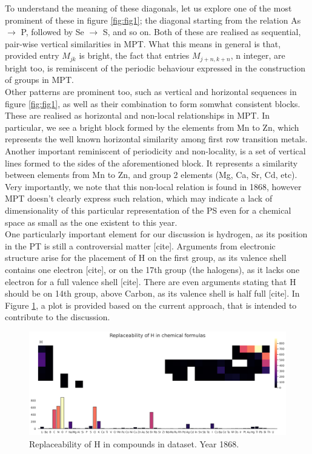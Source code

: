 \documentclass[article]{article}
\begin{document}
To understand the meaning of these diagonals, let us explore one of the most prominent of these in figure \ref{fig:fig1}; the diagonal starting from the relation As $\rightarrow$ P, followed by Se $\rightarrow$ S, and so on. Both of these are realised as sequential, pair-wise vertical similarities in MPT. What this means in general is that, provided entry $M_{jk}$ is bright, the fact that entries $M_{j+n,k+n}$, n integer, are bright too, is reminiscent of the periodic behaviour expressed in the construction of groups in MPT. \\

Other patterns are prominent too, such as vertical and horizontal sequences in figure \ref{fig:fig1}, as well as their combination to form somwhat consistent blocks. These are realised as horizontal and non-local relationships in MPT. In particular, we see a bright block formed by the elements from Mn to Zn, which represents the well known horizontal similarity among first row transition metals. Another important reminiscent of periodicity and non-locality, is a set of vertical lines formed to the sides of the aforementioned block. It represents a similarity between elements from Mn to Zn, and group 2 elements (Mg, Ca, Sr, Cd, etc). Very importantly, we note that this non-local relation is found in 1868, however MPT doesn't clearly express such relation, which may indicate a lack of dimensionality of this particular representation of the PS even for a chemical space as small as the one existent to this year.\\

One particularly important element for our discussion is hydrogen, as its position in the PT is still a controversial matter [cite]. Arguments from electronic structure arise for the placement of H on the first group, as its valence shell contains one electron [cite], or on the 17th group (the halogens), as it lacks one electron for a full valence shell [cite]. There are even arguments stating that H should be on 14th group, above Carbon, as its valence shell is half full [cite]. In Figure \ref{fig:fig2}, a plot is provided based on the current approach, that is intended to contribute to the discussion. 

\begin{figure}[h!]
  \centering
	\includegraphics[width=13.0cm]{replace_H.png}
	\caption{Replaceability of H in compounds in dataset. Year 1868.}
	\label{fig:fig2}
\end{figure}
\end{document}
